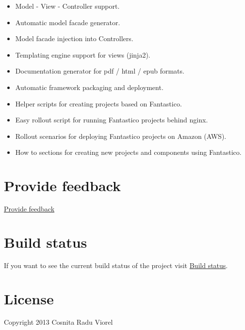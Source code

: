\documentclass[letterpaper,10pt,english]{sphinxmanual}
\begin{document}
\begin{itemize}
\begin{description}
\begin{itemize}
\item {} 
Model - View - Controller support.

\item {} 
Automatic model facade generator.

\item {} 
Model facade injection into Controllers.

\item {} 
Templating engine support for views (jinja2).

\item {} 
Documentation generator for pdf / html / epub formats.

\item {} 
Automatic framework packaging and deployment.

\item {} 
Helper scripts for creating projects based on Fantastico.

\item {} 
Easy rollout script for running Fantastico projects behind nginx.

\item {} 
Rollout scenarios for deploying Fantastico projects on Amazon (AWS).

\item {} 
How to sections for creating new projects and components using Fantastico.

\end{itemize}

\end{description}

\end{itemize}


\chapter{Provide feedback}
\label{index:provide-feedback}
\href{https://docs.google.com/forms/d/1tKBopU3lfDB\_w8F4h7Rl1Rn4uydAJq-nha09L\_ptJck/edit?usp=sharing}{Provide feedback}


\chapter{Build status}
\label{index:build-status}
If you want to see the current build status of the project visit \href{http://jenkins.scrum-expert.ro:8080/job/fantastico-framework/badge/icon/}{Build status}.


\chapter{License}
\label{index:license}
Copyright 2013 Cosnita Radu Viorel
\end{document}
